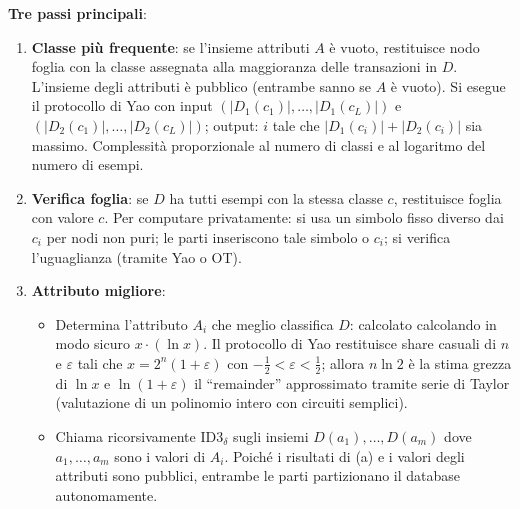\documentclass[a4paper,11pt]{article}
\begin{document}
\begin{definizione}
\textbf{Tre passi principali}:
\begin{enumerate}
  \item \textbf{Classe pi\`{u} frequente}: se l'insieme attributi $A$ \`{e} vuoto, restituisce nodo foglia con la classe assegnata alla maggioranza delle transazioni in $D$. L'insieme degli attributi \`{e} pubblico (entrambe sanno se $A$ \`{e} vuoto). Si esegue il protocollo di Yao con input $(|D_1(c_1)|, \ldots, |D_1(c_L)|)$ e $(|D_2(c_1)|, \ldots, |D_2(c_L)|)$; output: $i$ tale che $|D_1(c_i)| + |D_2(c_i)|$ sia massimo. Complessit\`{a} proporzionale al numero di classi e al logaritmo del numero di esempi.
  \item \textbf{Verifica foglia}: se $D$ ha tutti esempi con la stessa classe $c$, restituisce foglia con valore $c$. Per computare privatamente: si usa un simbolo fisso diverso dai $c_i$ per nodi non puri; le parti inseriscono tale simbolo o $c_i$; si verifica l'uguaglianza (tramite Yao o OT).
  \item \textbf{Attributo migliore}:
    \begin{itemize}
      \item[(a)] Determina l'attributo $A_i$ che meglio classifica $D$: calcolato calcolando in modo sicuro $x \cdot (\ln x)$. Il protocollo di Yao restituisce share casuali di $n$ e $\varepsilon$ tali che $x = 2^n(1+\varepsilon)$ con $-\frac{1}{2} < \varepsilon < \frac{1}{2}$; allora $n\ln 2$ \`{e} la stima grezza di $\ln x$ e $\ln(1+\varepsilon)$ il ``remainder'' approssimato tramite serie di Taylor (valutazione di un polinomio intero con circuiti semplici).
      \item[(b,c)] Chiama ricorsivamente ID3$_\delta$ sugli insiemi $D(a_1), \ldots, D(a_m)$ dove $a_1, \ldots, a_m$ sono i valori di $A_i$. Poich\'{e} i risultati di (a) e i valori degli attributi sono pubblici, entrambe le parti partizionano il database autonomamente.
    \end{itemize}
\end{enumerate}
\end{definizione}
\end{document}
